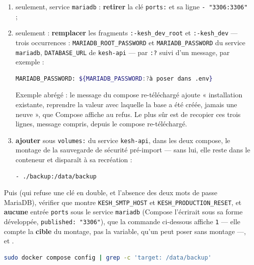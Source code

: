 \documentclass[a4paper,11pt,oneside]{article}
\begin{document}
\begin{enumerate}
\begin{lstlisting}[language=bash]
      KESH_ADMIN_PASSWORD: ${KESH_ADMIN_PASSWORD:-}
      KESH_LOG_FILE_PATH: ${KESH_LOG_FILE_PATH-/var/log/kesh/kesh.log}
\end{lstlisting}
    \item \begin{sloppypar} seulement, service \texttt{mariadb} : \textbf{retirer} la clé \texttt{ports:} et sa ligne \texttt{- "3306:3306"} ;\end{sloppypar}
    \item \begin{sloppypar} seulement : \textbf{remplacer} les fragments \texttt{:-kesh\_dev\_root} et \texttt{:-kesh\_dev} --- trois occurrences : \texttt{MARIADB\_ROOT\_PASSWORD} et \texttt{MARIADB\_PASSWORD} du service \texttt{mariadb}, \texttt{DATABASE\_URL} de \texttt{kesh-api} --- par \texttt{:?} suivi d'un message, par exemple :\end{sloppypar}
\begin{lstlisting}[language=bash]
      MARIADB_PASSWORD: ${MARIADB_PASSWORD:?à poser dans .env}
\end{lstlisting}
    Exemple abrégé : le message du compose re-téléchargé ajoute « installation existante, reprendre la valeur avec laquelle la base a été créée, jamais une neuve », que Compose affiche au refus. Le plus sûr est de recopier ces trois lignes, message compris, depuis le compose re-téléchargé.
    \item \textbf{ajouter} sous \texttt{volumes:} du service \texttt{kesh-api}, dans les deux compose, le montage de la sauvegarde de sécurité pré-import --- sans lui, elle reste dans le conteneur et disparaît à sa recréation :
\begin{lstlisting}[language=bash]
      - ./backup:/data/backup
\end{lstlisting}
\end{enumerate}
\begin{sloppypar}
Puis  (qui refuse une clé en double, et l'absence des deux mots de passe MariaDB), vérifier que  montre \texttt{KESH\_SMTP\_HOST} et \texttt{KESH\_PRODUCTION\_RESET}, et \textbf{aucune} entrée \texttt{ports} sous le service \texttt{mariadb} (Compose l'écrirait sous sa forme développée, \texttt{published: "3306"}), que la commande ci-dessous affiche \texttt{1} --- elle compte la \textbf{cible} du montage, pas la variable, qu'un  peut poser sans montage ---, et .
\end{sloppypar}
\begin{lstlisting}[language=bash]
sudo docker compose config | grep -c 'target: /data/backup'
\end{lstlisting}
\end{document}
